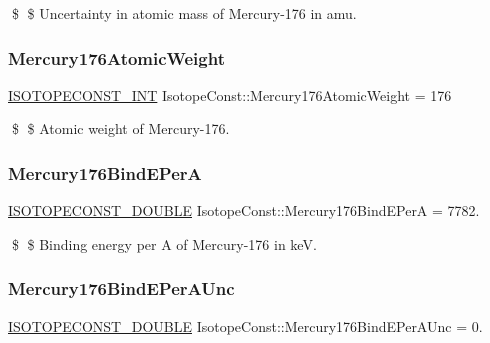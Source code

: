 \$ \$ Uncertainty in atomic mass of Mercury-\/176 in amu. \mbox{\label{group___isotope_const-_mercury-_hg176_ga780839db64801911be8c0231ff7e1e53}} 
\subsubsection{\texorpdfstring{Mercury176\+Atomic\+Weight}{Mercury176AtomicWeight}}
{\footnotesize\ttfamily \mbox{\hyperlink{group___isotope_const-_macros_ga5f18360b3e99483a35c32d789e62621c}{I\+S\+O\+T\+O\+P\+E\+C\+O\+N\+S\+T\+\_\+\+I\+NT}} Isotope\+Const\+::\+Mercury176\+Atomic\+Weight = 176}

\$ \$ Atomic weight of Mercury-\/176. \mbox{\label{group___isotope_const-_mercury-_hg176_gabc27bc2720d230d2c4612990c0870f35}} 
\subsubsection{\texorpdfstring{Mercury176\+Bind\+E\+PerA}{Mercury176BindEPerA}}
{\footnotesize\ttfamily \mbox{\hyperlink{group___isotope_const-_macros_ga8f45a7272ce02c0b4c65c44636ed719a}{I\+S\+O\+T\+O\+P\+E\+C\+O\+N\+S\+T\+\_\+\+D\+O\+U\+B\+LE}} Isotope\+Const\+::\+Mercury176\+Bind\+E\+PerA = 7782.}

\$ \$ Binding energy per A of Mercury-\/176 in keV. \mbox{\label{group___isotope_const-_mercury-_hg176_gac99d4a1c198ef5b7b2f7d6e312e880b5}} 
\subsubsection{\texorpdfstring{Mercury176\+Bind\+E\+Per\+A\+Unc}{Mercury176BindEPerAUnc}}
{\footnotesize\ttfamily \mbox{\hyperlink{group___isotope_const-_macros_ga8f45a7272ce02c0b4c65c44636ed719a}{I\+S\+O\+T\+O\+P\+E\+C\+O\+N\+S\+T\+\_\+\+D\+O\+U\+B\+LE}} Isotope\+Const\+::\+Mercury176\+Bind\+E\+Per\+A\+Unc = 0.}

